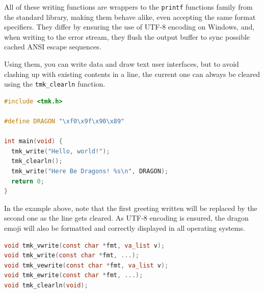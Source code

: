 \documentclass{report}
\begin{document}
All of these writing functions are wrappers to the \texttt{printf} functions family from the standard library, making them behave alike, even accepting the same format specifiers. They differ by ensuring the use of UTF-8 encoding on Windows, and, when writing to the error stream, they flush the output buffer to sync possible cached ANSI escape sequences.

Using them, you can write data and draw text user interfaces, but to avoid clashing up with existing contents in a line, the current one can always be cleared using the \texttt{tmk\_clearln} function.
\begin{lstlisting}[language=c,caption=an example using the writing functions.]
#include <tmk.h>

#define DRAGON "\xf0\x9f\x90\x89"

int main(void) {
  tmk_write("Hello, world!");
  tmk_clearln();
  tmk_write("Here Be Dragons! %s\n", DRAGON);
  return 0;
}
\end{lstlisting}

In the example above, note that the first greeting written will be replaced by the second one as the line gets cleared. As UTF-8 encoding is ensured, the dragon emoji will also be formatted and correctly displayed in all operating systems.
\begin{lstlisting}[language=c,caption=the declarations of the writing and clearing functions.]
void tmk_vwrite(const char *fmt, va_list v);
void tmk_write(const char *fmt, ...);
void tmk_vewrite(const char *fmt, va_list v);
void tmk_ewrite(const char *fmt, ...);
void tmk_clearln(void);
\end{lstlisting}
\end{document}
